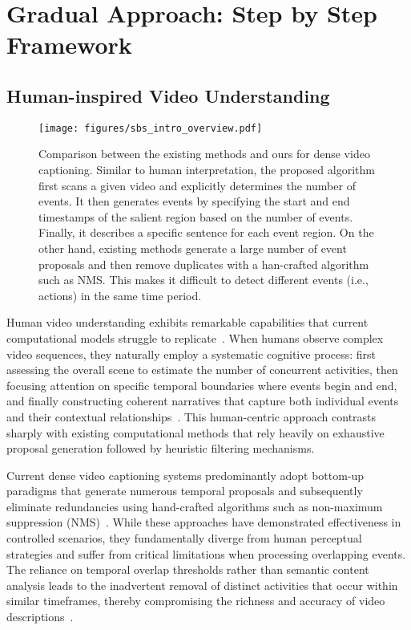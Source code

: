 
\chapter{Gradual Approach: Step by Step Framework}
\label{chap:gradual_pathway}

\section{Human-inspired Video Understanding}
\label{sec:human_inspired}

\begin{figure*}[t]
  \centering
  \texttt{[image: figures/sbs\_intro\_overview.pdf]}
  \caption{
    Comparison between the existing methods and ours for dense video captioning.
    Similar to human interpretation, the proposed algorithm first scans a given video and explicitly determines the number of events.
    It then generates events by specifying the start and end timestamps of the salient region based on the number of events.
    Finally, it describes a specific sentence for each event region.
    On the other hand, existing methods generate a large number of event proposals and then remove duplicates with a han-crafted algorithm such as NMS.\@
    This makes it difficult to detect different events (i.e., actions) in the same time period.
  }
  \label{fig:intro_overview}
\end{figure*}

Human video understanding exhibits remarkable capabilities that current computational models struggle to replicate~\cite{Heilbron2015-ha,Krishna2017-pw}. When humans observe complex video sequences, they naturally employ a systematic cognitive process: first assessing the overall scene to estimate the number of concurrent activities, then focusing attention on specific temporal boundaries where events begin and end, and finally constructing coherent narratives that capture both individual events and their contextual relationships~\cite{wang2020event,long2021temporal}. This human-centric approach contrasts sharply with existing computational methods that rely heavily on exhaustive proposal generation followed by heuristic filtering mechanisms.

Current dense video captioning systems predominantly adopt bottom-up paradigms that generate numerous temporal proposals and subsequently eliminate redundancies using hand-crafted algorithms such as non-maximum suppression (NMS)~\cite{Krishna2017-pw,Li2018-ll,Wang2018-ap,Zhou2018-zu}. While these approaches have demonstrated effectiveness in controlled scenarios, they fundamentally diverge from human perceptual strategies and suffer from critical limitations when processing overlapping events. The reliance on temporal overlap thresholds rather than semantic content analysis leads to the inadvertent removal of distinct activities that occur within similar timeframes, thereby compromising the richness and accuracy of video descriptions~\cite{Mun2019-ap,fujita2020soda}.

